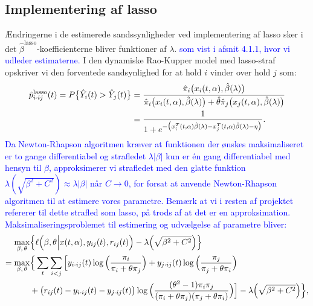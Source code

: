 \documentclass[11pt,a4paper]{article}
\begin{document}
\subsection{Implementering af lasso}
Ændringerne i de estimerede sandssynligheder ved implementering af lasso sker i det $\hat{\beta}^{\text{lasso}}$-koefficienterne bliver funktioner af $\lambda$. \textcolor{blue}{som vist i afsnit 4.1.1, hvor vi udleder estimaterne.} I den dynamiske Rao-Kupper model med lasso-straf opskriver vi den forventede sandsynlighed for at hold $i$ vinder over hold $j$ som:
\begin{align}
    \hat{p}^{\text{lasso}}_{i\cdot ij}(t)=P\big{\{}\hat{Y}_{i}(t)>\hat{Y}_{j}(t)\big{\}}
    &=\frac{\hat{\pi}_i\big{(}x_i(t,\alpha),\hat{\beta}(\lambda)\big{)}}{\hat{\pi}_i\big{(}x_i(t,\alpha),\hat{\beta}(\lambda)\big{)}+\hat{\theta}\hat{\pi}_j\big{(}x_j(t,\alpha),\hat{\beta}(\lambda)\big{)}}\\
    &=\frac{1}{1+e^{-\big{(}x_i^T(t,\alpha)\hat{\beta}(\lambda)-x_j^T(t,\alpha)\hat{\beta}(\lambda)-\eta\big{)}}}.
    \label{func:pdynlasso}
\end{align}
\textcolor{blue}{Da Newton-Rhapson algoritmen kræver at funktionen der ønskes maksimaliseret er to gange differentiabel og strafledet $\lambda |\beta|$ kun er én gang differentiabel med hensyn til $\beta$, approksimerer vi strafledet med den glatte funktion $\lambda(\sqrt{\beta^2+C^2})\approx\lambda |\beta|$ når $C\rightarrow 0$, for forsat at anvende Newton-Rhapson algoritmen til at estimere vores parametre. Bemærk at vi i resten af projektet refererer til dette strafled som lasso, på trods af at det er en approksimation. Maksimaliseringsproblemet til estimering og udvælgelse af parametre bliver:}
\begin{align*}
\max_{\beta,\,\theta} &\Big{\{}\ell\Big{(}\beta,\theta\Big{|}x(t,\alpha),y_{ij}(t),r_{ij}(t)\Big{)}-\lambda \Big{(}\sqrt{\beta^2+C^2}\Big{)}\Big{\}}\\
=\max_{\beta,\,\theta} 
&\Big{\{}\sum_{t}\sum_{i<j}\Big{[}y_{i\cdot ij}(t)\log\Big{(}\frac{\pi_i}{\pi_i+\theta\pi_j}\Big{)}
+ y_{j\cdot ij}(t)\log\Big{(}\frac{\pi_j}{\pi_j+\theta\pi_i}\Big{)}\\
&+ \big{(}r_{ij}(t)-y_{i\cdot ij}(t)-y_{j\cdot ij}(t)\big{)} \log\Big{(}\frac{(\theta^2-1)\pi_i \pi_j}{(\pi_i+\theta\pi_j)(\pi_j+\theta\pi_i)}\Big{)}\Big{]}-\lambda \Big{(}\sqrt{\beta^2+C^2}\Big{)}\Big{\}},
\end{align*}
\end{document}
